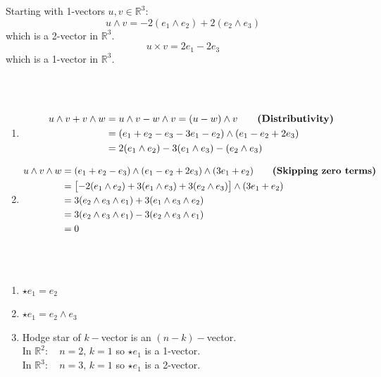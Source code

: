 \documentclass{article}
\begin{document}
\vspace{1.8cm}
\\\\

Starting with 1-vectors $u, v \in \mathbb{R}^3$:
$$u \wedge v = -2(e_1 \wedge e_2) + 2(e_2 \wedge e_3)$$ which is a 2-vector in $\mathbb{R}^3$.\\
$$u \times v = 2e_1 -2e_3$$ which is a 1-vector in $\mathbb{R}^3$.


\vspace{1.8cm}
\\\\

\begin{enumerate}[label=(\alph*)]
    \item
    \begin{align}
        u \wedge v + v \wedge w &= u \wedge v - w \wedge v = (u - w) \wedge v \tag*{\bfseries(Distributivity)}\\
            &= (e_1+e_2-e_3-3e_1-e_2) \wedge (e_1-e_2+2e_3) \notag\\
            &= 2(e_1 \wedge e_2) -3(e_1 \wedge e_3) - (e_2 \wedge e_3) \notag
    \end{align}
    \item
    \begin{align}
        u \wedge v \wedge w &= (e_1+e_2-e_3) \wedge (e_1-e_2+2e_3) \wedge (3e_1+e_2) \tag*{\bfseries(Skipping zero terms)}\\
            &= \bigl[ -2(e_1 \wedge e_2) + 3(e_1 \wedge e_3) +3(e_2 \wedge e_3) \bigr] \wedge (3e_1+e_2) \notag\\
            &= 3(e_2 \wedge e_3 \wedge e_1) + 3(e_1 \wedge e_3 \wedge e_2) \notag\\
            &= 3(e_2 \wedge e_3 \wedge e_1) - 3(e_2 \wedge e_3 \wedge e_1) \notag\\
            &= 0 \notag
    \end{align}
\end{enumerate}



\vspace{1.8cm}
\\\\


\begin{enumerate}[label=(\alph*)]
    \item $\star e_1 = e_2$
    \item $\star e_1 = e_2 \wedge e_3$
    \item Hodge star of $k-$vector is an $(n-k)-$vector.\\
    In $\mathbb{R}^2: \quad n = 2, \, k = 1$ so $\star e_1$ is a 1-vector.\\
    In $\mathbb{R}^3: \quad n = 3, \, k = 1$ so $\star e_1$ is a 2-vector.
\end{enumerate}
\end{document}
